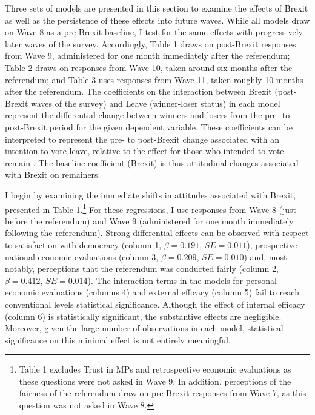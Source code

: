 \documentclass[12pt, letter]{article}
\begin{document}
Three sets of models are presented in this section to examine the effects of Brexit as well as the persistence of these effects into future waves. While all models draw on Wave 8 as a pre-Brexit baseline, I test for the same effects with progressively later waves of the survey. Accordingly, Table 1 draws on post-Brexit responses from Wave 9, administered for one month immediately after the referendum; Table 2 draws on responses from Wave 10, taken around six months after the referendum; and Table 3 uses responses from Wave 11, taken roughly 10 months after the referendum. The coefficients on the interaction between Brexit (post-Brexit waves of the survey) and Leave (winner-loser status) in each model represent the differential change between winners and losers from the pre- to post-Brexit period for the given dependent variable. These coefficients can be interpreted to represent the pre- to post-Brexit change associated with an intention to vote leave, relative to the effect for those who intended to vote remain \parencite{brambor2005understanding}. The baseline coefficient (Brexit) is thus attitudinal changes associated with Brexit on remainers.


I begin by examining the immediate shifts in attitudes associated with Brexit, presented in Table 1.\footnote{Table 1 excludes Trust in MPs and retrospective economic evaluations as these questions were not asked in Wave 9. In addition, perceptions of the fairness of the referendum draw on pre-Brexit responses from Wave 7, as this question was not asked in Wave 8.} For these regressions, I use responses from Wave 8 (just before the referendum) and Wave 9 (administered for one month immediately following the referendum). Strong differential effects can be observed with respect to satisfaction with democracy  (column 1, $\beta = 0.191$, $SE = 0.011$), prospective national economic evaluations (column 3, $\beta = 0.209$, $SE = 0.010$) and, most notably, perceptions that the referendum was conducted fairly (column 2, $\beta = 0.412$, $SE = 0.014$). The interaction terms in the models for personal economic evaluations (columns 4) and external efficacy (column 5) fail to reach conventional levels statistical significance. Although the effect of internal efficacy (column 6) is statistically significant, the substantive effects are negligible. Moreover, given the large number of observations in each model, statistical significance on this minimal effect is not entirely meaningful. 
\end{document}
